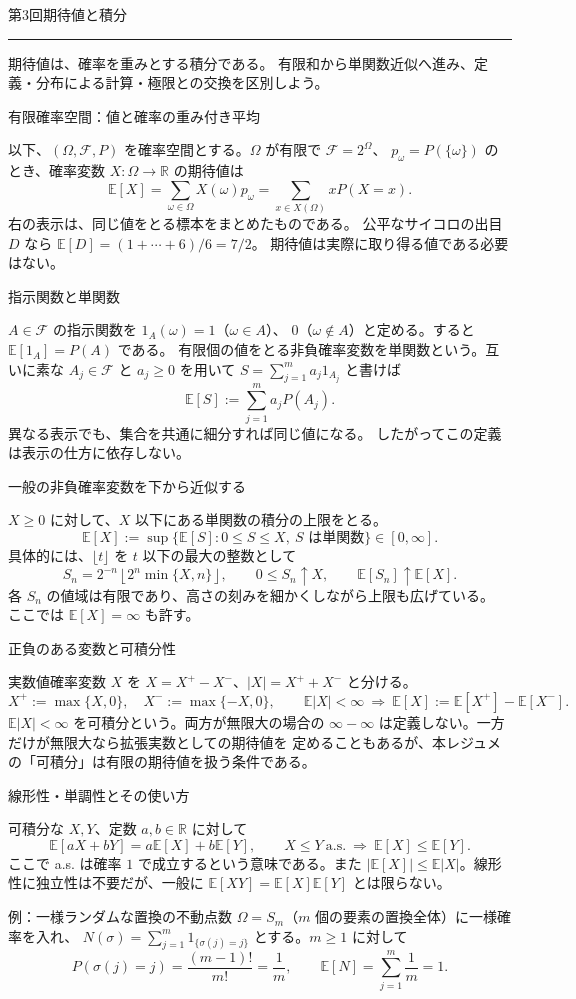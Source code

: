 \documentclass[a4paper,10pt,pdflatex,ja=standard,jafont=ipaex-type1,
  magstyle=real,scale=1]{bxjsarticle}
\newcommand{\topic}[1]{\par\vspace{5pt}
  {\large\sffamily\mdseries\color{accent}#1}\par\vspace{2pt}}
\newcommand{\handouttitle}[1]{\begin{center}
  {\Large\color{ink}#1}\par\vspace{3mm}
  {\color{accent}\rule{0.88\linewidth}{0.7pt}}
  \end{center}\vspace{-2mm}}
\newcommand{\keybox}[1]{\par\vspace{3pt}\begingroup
  \setlength{\fboxsep}{5pt}
  \colorbox{soft}{\parbox{\dimexpr\linewidth-2\fboxsep\relax}{#1}}
  \endgroup\par\vspace{2pt}}
\newcommand{\examplelabel}[1]{{\sffamily\mdseries\color{ink}#1}}
\newcommand{\F}{\mathcal F}
\newcommand{\R}{\mathbb R}
\newcommand{\E}{\mathbb E}
\newcommand{\ind}{\mathrm{1}}
\begin{document}
\handouttitle{第3回\quad 期待値と積分}
\keybox{期待値は、確率を重みとする積分である。
有限和から単関数近似へ進み、定義・分布による計算・極限との交換を区別しよう。}

\topic{有限確率空間：値と確率の重み付き平均}
以下、$(\Omega,\F,P)$ を確率空間とする。$\Omega$ が有限で $\F=2^\Omega$、
$p_\omega=P(\{\omega\})$ のとき、確率変数 $X:\Omega\to\R$ の期待値は
$$
  \E[X]=\sum_{\omega\in\Omega}X(\omega)p_\omega
  =\sum_{x\in X(\Omega)}xP(X=x).
$$
右の表示は、同じ値をとる標本をまとめたものである。
公平なサイコロの出目 $D$ なら $\E[D]=(1+\cdots+6)/6=7/2$。
期待値は実際に取り得る値である必要はない。

\topic{指示関数と単関数}
$A\in\F$ の指示関数を $\ind_A(\omega)=1$（$\omega\in A$）、
$0$（$\omega\notin A$）と定める。すると $\E[\ind_A]=P(A)$ である。
有限個の値をとる非負確率変数を単関数という。互いに素な $A_j\in\F$ と
$a_j\ge0$ を用いて $S=\sum_{j=1}^m a_j\ind_{A_j}$ と書けば
$$
  \E[S]:=\sum_{j=1}^m a_jP(A_j).
$$
異なる表示でも、集合を共通に細分すれば同じ値になる。
したがってこの定義は表示の仕方に依存しない。

\topic{一般の非負確率変数を下から近似する}
$X\ge0$ に対して、$X$ 以下にある単関数の積分の上限をとる。
$$
  \E[X]:=\sup\{\E[S]:0\le S\le X,\ S\text{ は単関数}\}
  \in[0,\infty].
$$
具体的には、$\lfloor t\rfloor$ を $t$ 以下の最大の整数として
$$
  S_n=2^{-n}\left\lfloor 2^n\min\{X,n\}\right\rfloor,
  \qquad 0\le S_n\uparrow X,\qquad \E[S_n]\uparrow\E[X].
$$
各 $S_n$ の値域は有限であり、高さの刻みを細かくしながら上限も広げている。
ここでは $\E[X]=\infty$ も許す。

\topic{正負のある変数と可積分性}
実数値確率変数 $X$ を $X=X^+-X^-$、$|X|=X^++X^-$ と分ける。
$$
  X^+:=\max\{X,0\},\quad X^-:=\max\{-X,0\},\qquad
  \E|X|<\infty\ \Longrightarrow\ \E[X]:=\E[X^+]-\E[X^-].
$$
$\E|X|<\infty$ を可積分という。両方が無限大の場合の
$\infty-\infty$ は定義しない。一方だけが無限大なら拡張実数としての期待値を
定めることもあるが、本レジュメの「可積分」は有限の期待値を扱う条件である。

\newpage
\topic{線形性・単調性とその使い方}
可積分な $X,Y$、定数 $a,b\in\R$ に対して
$$
  \E[aX+bY]=a\E[X]+b\E[Y],\qquad
  X\le Y\ \text{a.s.}\ \Longrightarrow\ \E[X]\le\E[Y].
$$
ここで a.s. は確率 $1$ で成立するという意味である。また
$|\E[X]|\le\E|X|$。線形性に独立性は不要だが、一般に
$\E[XY]=\E[X]\E[Y]$ とは限らない。

\examplelabel{例：一様ランダムな置換の不動点数}
$\Omega=S_m$（$m$ 個の要素の置換全体）に一様確率を入れ、
$N(\sigma)=\sum_{j=1}^m\ind_{\{\sigma(j)=j\}}$ とする。$m\ge1$ に対して
$$
  P(\sigma(j)=j)=\frac{(m-1)!}{m!}=\frac1m,
  \qquad \E[N]=\sum_{j=1}^m\frac1m=1.
$$
\end{document}
